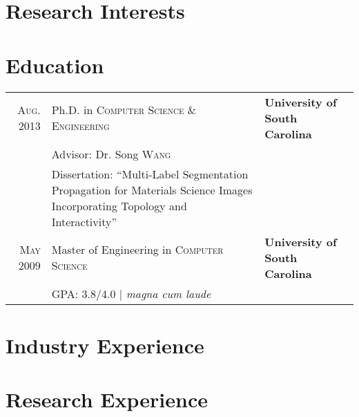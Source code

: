 \documentclass[10pt]{article}
\begin{document}
\pagestyle{empty}

\par{\bigskip\par}

\biographical

\section{Research Interests}

\interestsLong

\vspace{-\baselineskip}

\section{Education}
\begin{tabularx}{\linewidth}{@{}r X l}
  \textsc{Aug. 2013} & Ph.D. in \textsc{Computer Science \& Engineering} & \textbf{University of South Carolina}\\
  & \small Advisor: Dr. Song \textsc{Wang} & \\%
  & \footnotesize Dissertation: ``Multi-Label Segmentation Propagation for Materials Science Images Incorporating Topology and Interactivity'' & \\[4ex]%
  \textsc{May} 2009 & Master of Engineering in \textsc{Computer Science} & \textbf{University of South Carolina}\\
  &\normalsize \textsc{GPA}: 3.8/4.0 | \small\emph{magna cum laude} \\[1ex]%
\end{tabularx}

\vspace{-\baselineskip}

\section{Industry Experience}

\rally
\drw
\groupon
\terrastride
\palmettocomputerlabs
\elasticvision

\section{Research Experience}

\newcommand{\academic}[4]{
\textsc{#1} & #2 \\
\nopagebreak &\emph{#3}\\
\nopagebreak &\footnotesize{#4} \\
\nopagebreak \multicolumn{2}{c}{} \\ [-1ex]
}
\end{document}
